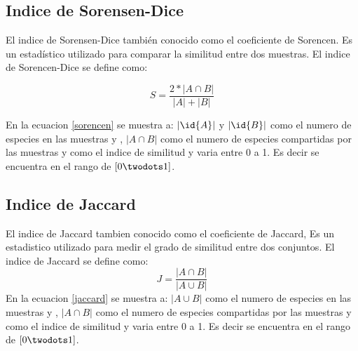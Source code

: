 \subsection{Indice de Sorensen-Dice}
El indice de Sorensen-Dice también conocido como el coeficiente de Sorencen. Es un estadístico utilizado para comparar la similitud entre dos muestras. El indice de Sorencen-Dice se define como:

\begin{equation}
S = \frac{2*|A \cap B|}{|A|+|B|}
\label{sorencen}
\end{equation}

En la ecuacion \ref{sorencen} se muestra a: $|\id{A}|$ y $|\id{B}|$ como el numero de especies en las muestras  y , $|A \cap B|$ como el numero de especies compartidas por las muestras y  como el indice de similitud y varia entre 0 a 1. Es decir se encuentra en el rango de $[0 \twodots 1]$.

\subsection{Indice de Jaccard}
El indice de Jaccard tambien conocido como el coeficiente de Jaccard, Es un estadistico utilizado para medir el grado de similitud entre dos conjuntos. El indice de Jaccard se define como:
\begin{equation}
J = \frac{|A \cap B|}{|A \cup B|}
\label{jaccard}
\end{equation}
En la ecuacion \ref{jaccard} se muestra a: $|A \cup B|$ como el numero de especies en las muestras  y , $|A \cap B|$ como el numero de especies compartidas por las muestras y  como el indice de similitud y varia entre 0 a 1. Es decir se encuentra en el rango de $[0 \twodots 1]$.
